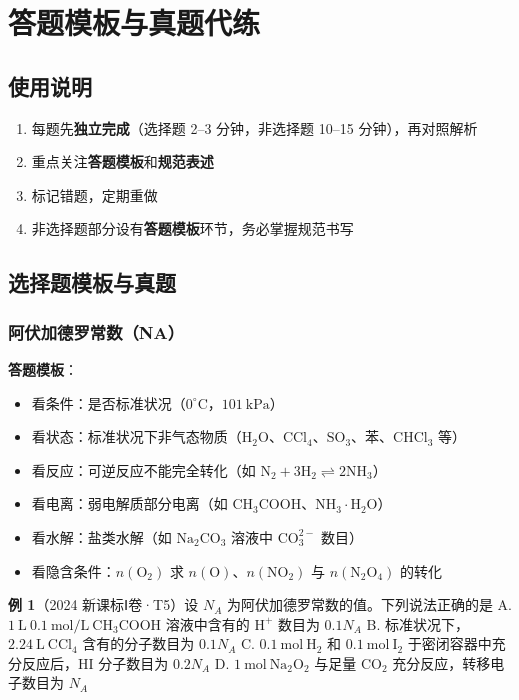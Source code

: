 \section{答题模板与真题代练}

\subsection{使用说明}

\begin{enumerate}
  \item 每题先\textbf{独立完成}（选择题 2--3 分钟，非选择题 10--15 分钟），再对照解析
  \item 重点关注\textbf{答题模板}和\textbf{规范表述}
  \item 标记错题，定期重做
  \item 非选择题部分设有\textbf{答题模板}环节，务必掌握规范书写
\end{enumerate}

\subsection{选择题模板与真题}

\subsubsection{阿伏加德罗常数（NA）}

\textbf{答题模板}：
\begin{itemize}
  \item 看条件：是否标准状况（$0^\circ\text{C}$，$101\ \text{kPa}$）
  \item 看状态：标准状况下非气态物质（$\text{H}_2\text{O}$、$\text{CCl}_4$、$\text{SO}_3$、苯、$\text{CHCl}_3$ 等）
  \item 看反应：可逆反应不能完全转化（如 $\text{N}_2+3\text{H}_2 \rightleftharpoons 2\text{NH}_3$）
  \item 看电离：弱电解质部分电离（如 $\text{CH}_3\text{COOH}$、$\text{NH}_3\cdot\text{H}_2\text{O}$）
  \item 看水解：盐类水解（如 $\text{Na}_2\text{CO}_3$ 溶液中 $\text{CO}_3^{2-}$ 数目）
  \item 看隐含条件：$n(\text{O}_2)$ 求 $n(\text{O})$、$n(\text{NO}_2)$ 与 $n(\text{N}_2\text{O}_4)$ 的转化
\end{itemize}

\textbf{例 1}（2024 新课标Ⅰ卷·T5）设 $N_A$ 为阿伏加德罗常数的值。下列说法正确的是
A. $1\ \text{L}\ 0.1\ \text{mol/L}\ \text{CH}_3\text{COOH}$ 溶液中含有的 $\text{H}^+$ 数目为 $0.1N_A$
B. 标准状况下，$2.24\ \text{L}\ \text{CCl}_4$ 含有的分子数目为 $0.1N_A$
C. $0.1\ \text{mol}\ \text{H}_2$ 和 $0.1\ \text{mol}\ \text{I}_2$ 于密闭容器中充分反应后，$\text{HI}$ 分子数目为 $0.2N_A$
D. $1\ \text{mol}\ \text{Na}_2\text{O}_2$ 与足量 $\text{CO}_2$ 充分反应，转移电子数目为 $N_A$

